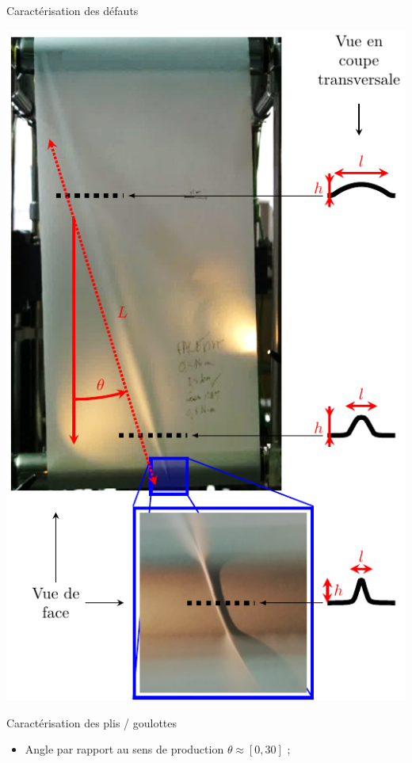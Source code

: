 \documentclass[8pt]{beamer}
\begin{document}
	\begin{frame}{Caractérisation des défauts}
		\begin{minipage}[c]{.38\linewidth}\centering
			\includegraphics[width=\linewidth]{caracterisation_plis.pdf}
		\end{minipage}\hfill
		\begin{minipage}[c]{.57\linewidth}
			\begin{block}{Caractérisation des plis / goulottes}
				\begin{itemize}
					\item Angle par rapport au sens de production $\theta \approx \left[0, 30\right]$\si{\degres} ;

\end{itemize}
\end{block}
\end{minipage}
\end{frame}
\end{document}
